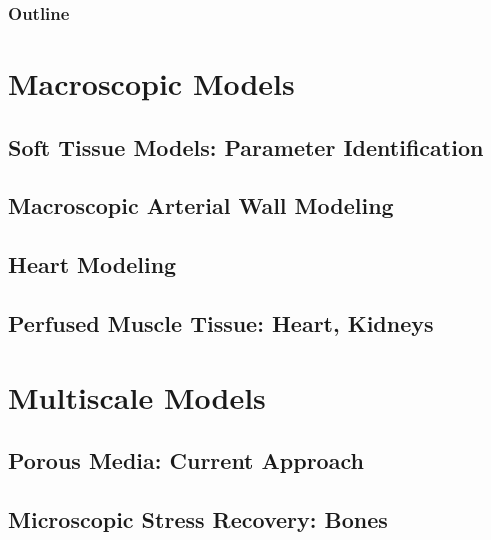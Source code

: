 \documentclass[10pt,t]{beamer}
\begin{document}
\frame{\titlepage}

\begin{frame}
  \frametitle{Outline}
  \tableofcontents
\end{frame}

\section{Macroscopic Models}

\subsection{Soft Tissue Models: Parameter Identification}



\subsection{Macroscopic Arterial Wall Modeling}



\subsection{Heart Modeling}



\subsection{Perfused Muscle Tissue: Heart, Kidneys}



\section{Multiscale Models}

\subsection{Porous Media: Current Approach}



\subsection{Microscopic Stress Recovery: Bones}


\end{document}
